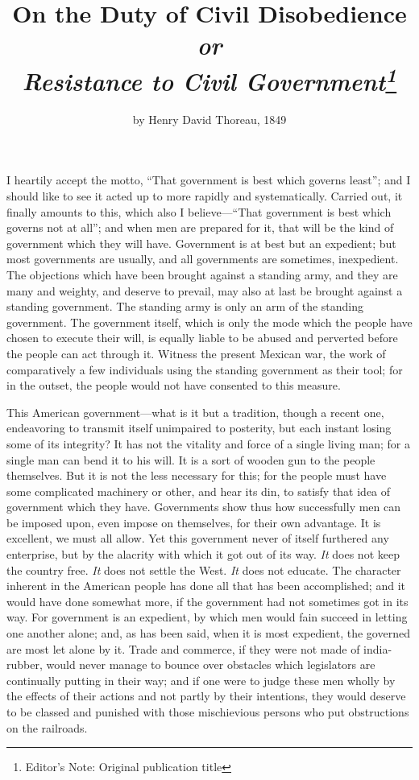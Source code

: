 \documentclass[12pt]{article}
\title{\vspace{-2.5cm}On the Duty of Civil Disobedience\\ \textit{\normalsize or}\\ \textit{\large Resistance to Civil Government\footnote{Editor's Note: Original publication title}}\vspace{-3mm}}
\author{by Henry David Thoreau, 1849}
\date{\vspace{-2em}}
\begin{document}
\maketitle
I heartily accept the motto, ``That government is best which governs
least''; and I should like to see it acted up to more rapidly and
systematically. Carried out, it finally amounts to this, which also I
believe---``That government is best which governs not at all''; and when
men are prepared for it, that will be the kind of government which they
will have. Government is at best but an expedient; but most governments
are usually, and all governments are sometimes, inexpedient. The
objections which have been brought against a standing army, and they are
many and weighty, and deserve to prevail, may also at last be brought
against a standing government. The standing army is only an arm of the
standing government. The government itself, which is only the mode which
the people have chosen to execute their will, is equally liable to be
abused and perverted before the people can act through it. Witness the
present Mexican war, the work of comparatively a few individuals using
the standing government as their tool; for in the outset, the people
would not have consented to this measure.

This American government---what is it but a tradition, though a recent
one, endeavoring to transmit itself unimpaired to posterity, but each
instant losing some of its integrity? It has not the vitality and force
of a single living man; for a single man can bend it to his will. It is
a sort of wooden gun to the people themselves. But it is not the less
necessary for this; for the people must have some complicated machinery
or other, and hear its din, to satisfy that idea of government which
they have. Governments show thus how successfully men can be imposed
upon, even impose on themselves, for their own advantage. It is
excellent, we must all allow. Yet this government never of itself
furthered any enterprise, but by the alacrity with which it got out of
its way. \emph{It} does not keep the country free. \emph{It} does not
settle the West. \emph{It} does not educate. The character inherent in
the American people has done all that has been accomplished; and it
would have done somewhat more, if the government had not sometimes got
in its way. For government is an expedient, by which men would fain
succeed in letting one another alone; and, as has been said, when it is
most expedient, the governed are most let alone by it. Trade and
commerce, if they were not made of india-rubber, would never manage to
bounce over obstacles which legislators are continually putting in their
way; and if one were to judge these men wholly by the effects of their
actions and not partly by their intentions, they would deserve to be
classed and punished with those mischievious persons who put
obstructions on the railroads.
\end{document}
